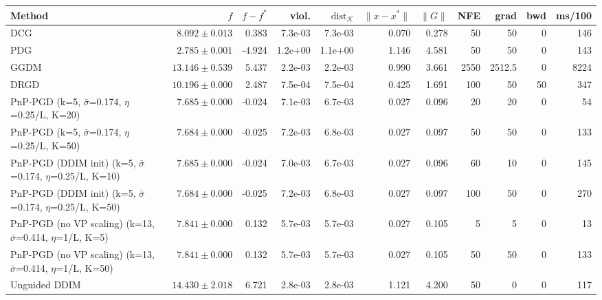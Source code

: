 \begin{tabular}{lrrrrrrrrrr}
\toprule
Method & $f$ & $f-f^*$ & viol. & $\mathrm{dist}_\mathcal{K}$ & $\|x-x^*\|$ & $\|G\|$ & NFE & grad & bwd & ms/100 \\
\midrule
DCG & $8.092\pm0.013$ & 0.383 & 7.3e-03 & 7.3e-03 & 0.070 & 0.278 & 50 & 50 & 0 & 146 \\
PDG & $2.785\pm0.001$ & -4.924 & 1.2e+00 & 1.1e+00 & 1.146 & 4.581 & 50 & 50 & 0 & 143 \\
GGDM & $13.146\pm0.539$ & 5.437 & 2.2e-03 & 2.2e-03 & 0.990 & 3.661 & 2550 & 2512.5 & 0 & 8224 \\
DRGD & $10.196\pm0.000$ & 2.487 & 7.5e-04 & 7.5e-04 & 0.425 & 1.691 & 100 & 50 & 50 & 347 \\
PnP-PGD (k=5, $\bar\sigma$=0.174, $\eta$=0.25/L, K=20) & $7.685\pm0.000$ & -0.024 & 7.1e-03 & 6.7e-03 & 0.027 & 0.096 & 20 & 20 & 0 & 54 \\
PnP-PGD (k=5, $\bar\sigma$=0.174, $\eta$=0.25/L, K=50) & $7.684\pm0.000$ & -0.025 & 7.2e-03 & 6.8e-03 & 0.027 & 0.097 & 50 & 50 & 0 & 133 \\
PnP-PGD (DDIM init) (k=5, $\bar\sigma$=0.174, $\eta$=0.25/L, K=10) & $7.685\pm0.000$ & -0.024 & 7.0e-03 & 6.7e-03 & 0.027 & 0.096 & 60 & 10 & 0 & 145 \\
PnP-PGD (DDIM init) (k=5, $\bar\sigma$=0.174, $\eta$=0.25/L, K=50) & $7.684\pm0.000$ & -0.025 & 7.2e-03 & 6.8e-03 & 0.027 & 0.097 & 100 & 50 & 0 & 270 \\
PnP-PGD (no VP scaling) (k=13, $\bar\sigma$=0.414, $\eta$=1/L, K=5) & $7.841\pm0.000$ & 0.132 & 5.7e-03 & 5.7e-03 & 0.027 & 0.105 & 5 & 5 & 0 & 13 \\
PnP-PGD (no VP scaling) (k=13, $\bar\sigma$=0.414, $\eta$=1/L, K=50) & $7.841\pm0.000$ & 0.132 & 5.7e-03 & 5.7e-03 & 0.027 & 0.105 & 50 & 50 & 0 & 133 \\
Unguided DDIM & $14.430\pm2.018$ & 6.721 & 2.8e-03 & 2.8e-03 & 1.121 & 4.200 & 50 & 0 & 0 & 117 \\
\bottomrule
\end{tabular}

